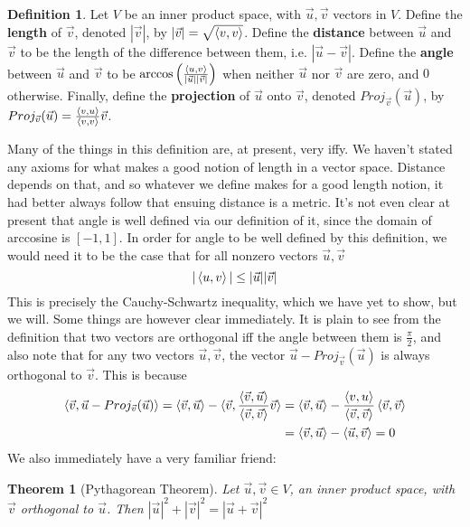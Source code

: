 \documentclass{article}
\theoremstyle{definition}
\newtheorem{definition}{Definition}[section]
\theoremstyle{plain}
\theoremstyle{theorem}
\newtheorem{theorem}{Theorem}[section]
\begin{document}
\begin{definition}
	Let $V$ be an inner product space, with $\vec{u},\vec{v}$ vectors in $V$. Define the \textbf{length} of $\vec{v}$, denoted $|\vec{v}|$, by $|\vec{v}| = \sqrt{\braket{v,v}}$. Define the \textbf{distance} between $\vec{u}$ and $\vec{v}$ to be the length of the difference between them, i.e. $|\vec{u}-\vec{v}|$. Define the \textbf{angle} between $\vec{u}$ and $\vec{v}$ to be $\arccos\left(\frac{\braket{u,v}}{|\vec{u}||\vec{v}|}\right)$ when neither $\vec{u}$ nor $\vec{v}$ are zero, and $0$ otherwise. Finally, define the \textbf{projection} of $\vec{u}$ onto $\vec{v}$, denoted $Proj_{\vec{v}}(\vec{u})$, by $Proj_{\vec{v}}(\vec{u}) = \frac{\braket{v,u}}{\braket{v,v}}\vec{v}$. 
\end{definition}
Many of the things in this definition are, at present, very iffy. We haven't stated any axioms for what makes a good notion of length in a vector space. Distance depends on that, and so whatever we define makes for a good length notion, it had better always follow that ensuing distance is a metric. It's not even clear at present that angle is well defined via our definition of it, since the domain of arccosine is $[-1,1]$. In order for angle to be well defined by this definition, we would need it to be the case that for all nonzero vectors $\vec{u},\vec{v}$ 
	\[ |\braket{u,v}| \leq |\vec{u}||\vec{v}| \]
This is precisely the Cauchy-Schwartz inequality, which we have yet to show, but we will. Some things are however clear immediately. It is plain to see from the definition that two vectors are orthogonal iff the angle between them is $\frac{\pi}{2}$, and also note that for any two vectors $\vec{u},\vec{v}$, the vector $\vec{u}-Proj_{\vec{v}}(\vec{u})$ is always orthogonal to $\vec{v}$. This is because
\begin{align*} 
\braket{\vec{v},\vec{u}-Proj_{\vec{v}}(\vec{u})} = \braket{\vec{v},\vec{u}}-\braket{\vec{v},\frac{\braket{\vec{v},\vec{u}}}{\braket{\vec{v},\vec{v}}}\vec{v}} 
&= \braket{\vec{v},\vec{u}} - \frac{\braket{v,u}}{\braket{\vec{v},\vec{v}}}\braket{\vec{v},\vec{v}} \\
&= \braket{\vec{v},\vec{u}} - \braket{\vec{u},\vec{v}} = 0 
\end{align*}
We also immediately have a very familiar friend:
\begin{theorem}[Pythagorean Theorem]
	Let $\vec{u},\vec{v} \in V$, an inner product space, with $\vec{v}$ orthogonal to $\vec{u}$. Then $|\vec{u}|^2+|\vec{v}|^2 = |\vec{u}+\vec{v}|^2$
\end{theorem}
\end{document}
